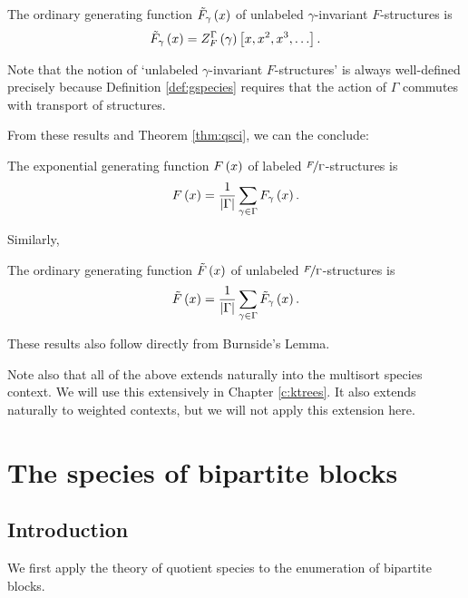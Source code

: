 \documentclass[distribution,draft]{brandiss} %
\numberwithin{section}{chapter}
\numberwithin{figure}{chapter}
\begin{document}
\begin{theorem}
  \label{thm:gciogf}
  The ordinary generating function $\tilde{F}_{\gamma} \left( {x} \right)$ of unlabeled $\gamma$-invariant $F$-structures is
  \begin{equation}
    \label{eq:gciogf}
    \tilde{F}_{\gamma} \left( {x} \right) =  Z_{F}^{{\Gamma} {}}  \left( {\gamma} \right) \left[ {x, x^{2}, x^{3}, \dots} \right].
  \end{equation}
\end{theorem}
Note that the notion of `unlabeled $\gamma$-invariant $F$-structures' is always well-defined precisely because Definition \ref{def:gspecies} requires that the action of $\Gamma$ commutes with transport of structures.

From these results and Theorem \ref{thm:qsci}, we can the conclude:
\begin{theorem}
  \label{qgciegf}
  The exponential generating function $F \left( {x} \right)$ of labeled $\nicefrac{F}{\Gamma}$-structures is
  \begin{equation}
    \label{eq:qgciegf}
    F \left( {x} \right) = \frac{1}{\left\vert {\Gamma} \right\vert} \sum_{\gamma \in \Gamma} F_{\gamma} \left( {x} \right).
  \end{equation}
\end{theorem}

Similarly,
\begin{theorem}
  \label{qgciogf}
  The ordinary generating function $\tilde{F} \left( {x} \right)$ of unlabeled $\nicefrac{F}{\Gamma}$-structures is
  \begin{equation}
    \label{eq:qgcogf}
    \tilde{F} \left( {x} \right) = \frac{1}{\left\vert {\Gamma} \right\vert} \sum_{\gamma \in \Gamma} \tilde{F}_{\gamma} \left( {x} \right).
  \end{equation}
\end{theorem}

These results also follow directly from Burnside's Lemma.

Note also that all of the above extends naturally into the multisort species context.
We will use this extensively in Chapter \ref{c:ktrees}.
It also extends naturally to weighted contexts, but we will not apply this extension here.

\chapter{The species of bipartite blocks}\label{c:bpblocks}
\section{Introduction}\label{s:bpintro}
We first apply the theory of quotient species to the enumeration of bipartite blocks.
\end{document}
